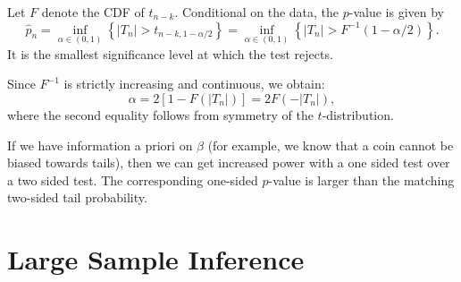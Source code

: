\begin{remark}
	Let $F$ denote the CDF of $t_{n-k}$. Conditional on the data, the $p$-value is given by \[
		\hat{p}_n = \inf_{\alpha \in (0,1)} \left\{ |T_n| > t_{n-k,1-\alpha/2} \right\} = \inf_{\alpha \in (0,1)} \left\{ |T_n| > F^{-1}(1-\alpha/2) \right\}
	.\] 
	It is the smallest significance level at which the test rejects.
	
	Since $F^{-1}$ is strictly increasing and continuous, we obtain: \[
		\alpha = 2[1 - F(|T_n|)] = 2F(-|T_n|)
	,\] 
	where the second equality follows from symmetry of the $t$-distribution.
\end{remark}

\begin{remark}
	If we have information a priori on $\beta$ (for example, we know that a coin cannot be biased towards tails), then we can get increased power with a one sided test over a two sided test. The corresponding one-sided $p$-value is larger than the matching two-sided tail probability.
\end{remark}

\section{Large Sample Inference}

